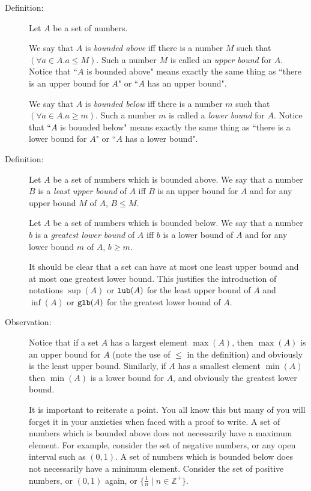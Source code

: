 \documentclass[12pt]{article}
\begin{document}
\begin{description}

\item[Definition:]  Let $A$ be a set of numbers.  

We say that $A$ is {\em bounded above\/} iff there is a number $M$ such that $(\forall a \in A.a \leq M)$.  Such a number $M$ is called an {\em upper bound\/} for $A$.  Notice that ``$A$ is bounded above" means exactly the same thing as ``there is an upper bound for $A$"  or ``$A$ has an upper bound". 

We say that $A$ is {\em bounded below\/} iff there is a number $m$ such that $(\forall a \in A.a \geq m)$.  Such a number $m$ is called a {\em lower bound\/} for $A$.  Notice that ``$A$ is bounded below" means exactly the same thing as ``there is a lower bound for $A$"  or ``$A$ has a lower bound". 

\item[Definition:]  Let $A$ be a set of numbers which is bounded above.  We say that a number $B$ is a {\em least upper bound\/} of $A$ iff $B$ is an upper bound for $A$ and for any upper bound $M$ of $A$, $B \leq M$.

 Let $A$ be a set of numbers which is bounded below.  We say that a number $b$ is a {\em greatest lower bound\/} of $A$ iff $b$ is a lower bound of $A$  and for any lower bound $m$ of $A$, $b \geq m$.

It should be clear that a set can have at most one least upper bound and at most one greatest lower bound.  This justifies the introduction of notations $\sup(A)$ or ${\tt lub}(A)$ for the least upper bound of $A$ and $\inf(A)$ or ${\tt glb}(A)$ for the
greatest lower bound of $A$.

\item[Observation:]  Notice that if a set $A$ has a largest element $\max(A)$, then $\max(A)$ is an upper bound for $A$ (note the use of $\leq$ in the definition) and obviously is the least upper bound.  Similarly, if $A$ has a smallest element $\min(A)$
then $\min(A)$ is a lower bound for $A$, and obviously the greatest lower bound.

It is important to reiterate a point.  You all know this but many of you will forget it in your anxieties when faced with a proof to write.  A set of numbers which is bounded above does not necessarily have a maximum element.  For example, consider the set of negative numbers, or any open interval such as $(0,1)$.  A set of numbers which is bounded below does not necessarily have a minimum element.  Consider the set of positive numbers, or $(0,1)$ again, or $\{ \frac 1n\mid n \in {\mathbb Z}^+\}$.


\end{description}
\end{document}
